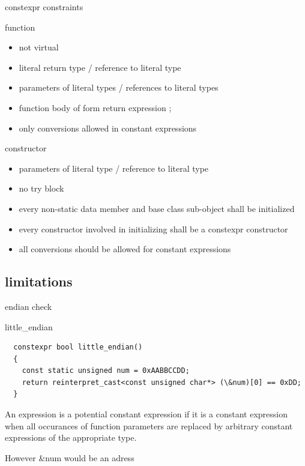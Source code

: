 \documentclass{beamer}
\begin{document}
\begin{frame}{constexpr constraints}
  \begin{block}{function}
    \begin{itemize}
    \item not virtual
    \item literal return type / reference to literal type
    \item parameters of literal types / references to literal types
    \item function body of form { return expression ; }
    \item only conversions allowed in constant expressions
    \end{itemize}
  \end{block}

  \begin{block}{constructor}
    \begin{itemize}
    \item parameters of literal type / reference to literal type
    \item no try block
    \item every non-static data member and base class sub-object shall be initialized
    \item every constructor involved in initializing shall be a constexpr constructor
    \item all conversions should be allowed for constant expressions
    \end{itemize}
  \end{block}
\end{frame}

\subsection{limitations}
\begin{frame}{endian check}
  \begin{block}{little\_endian}
\begin{verbatim}
  constexpr bool little_endian()
  {
    const static unsigned num = 0xAABBCCDD;
    return reinterpret_cast<const unsigned char*> (\&num)[0] == 0xDD;
  }

\end{verbatim}
An expression is a potential constant expression if it is a constant
expression when all occurances of function parameters are replaced by
arbitrary constant expressions of the appropriate type.

However \&num would be an adress
  \end{block}
\end{frame}
\end{document}
